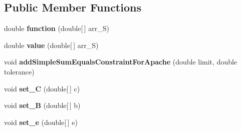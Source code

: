\subsection*{Public Member Functions}
\begin{DoxyCompactItemize}
\item 
\hypertarget{classuk_1_1ac_1_1dmu_1_1iesd_1_1cascade_1_1util_1_1_minimisation_function_neural_net_ready_a0972dbc78e401e600ed1d9291a688a9b}{double {\bfseries function} (double\mbox{[}$\,$\mbox{]} arr\-\_\-\-S)}\label{classuk_1_1ac_1_1dmu_1_1iesd_1_1cascade_1_1util_1_1_minimisation_function_neural_net_ready_a0972dbc78e401e600ed1d9291a688a9b}

\item 
\hypertarget{classuk_1_1ac_1_1dmu_1_1iesd_1_1cascade_1_1util_1_1_minimisation_function_neural_net_ready_aa5935086daba2fcd07e4b43eaab33116}{double {\bfseries value} (double\mbox{[}$\,$\mbox{]} arr\-\_\-\-S)}\label{classuk_1_1ac_1_1dmu_1_1iesd_1_1cascade_1_1util_1_1_minimisation_function_neural_net_ready_aa5935086daba2fcd07e4b43eaab33116}

\item 
\hypertarget{classuk_1_1ac_1_1dmu_1_1iesd_1_1cascade_1_1util_1_1_minimisation_function_neural_net_ready_aaf97bfcd7069b9516cbd2e78a2135711}{void {\bfseries add\-Simple\-Sum\-Equals\-Constraint\-For\-Apache} (double limit, double tolerance)}\label{classuk_1_1ac_1_1dmu_1_1iesd_1_1cascade_1_1util_1_1_minimisation_function_neural_net_ready_aaf97bfcd7069b9516cbd2e78a2135711}

\item 
\hypertarget{classuk_1_1ac_1_1dmu_1_1iesd_1_1cascade_1_1util_1_1_minimisation_function_neural_net_ready_a7cc2ae968329d8b0d4a3d2a8f60862d7}{void {\bfseries set\-\_\-\-C} (double\mbox{[}$\,$\mbox{]} c)}\label{classuk_1_1ac_1_1dmu_1_1iesd_1_1cascade_1_1util_1_1_minimisation_function_neural_net_ready_a7cc2ae968329d8b0d4a3d2a8f60862d7}

\item 
\hypertarget{classuk_1_1ac_1_1dmu_1_1iesd_1_1cascade_1_1util_1_1_minimisation_function_neural_net_ready_aa621bcbad41495297d1c5b10ec747442}{void {\bfseries set\-\_\-\-B} (double\mbox{[}$\,$\mbox{]} b)}\label{classuk_1_1ac_1_1dmu_1_1iesd_1_1cascade_1_1util_1_1_minimisation_function_neural_net_ready_aa621bcbad41495297d1c5b10ec747442}

\item 
\hypertarget{classuk_1_1ac_1_1dmu_1_1iesd_1_1cascade_1_1util_1_1_minimisation_function_neural_net_ready_a9f7f0807476b32534655305ce8133317}{void {\bfseries set\-\_\-e} (double\mbox{[}$\,$\mbox{]} e)}\label{classuk_1_1ac_1_1dmu_1_1iesd_1_1cascade_1_1util_1_1_minimisation_function_neural_net_ready_a9f7f0807476b32534655305ce8133317}


\end{DoxyCompactItemize}

